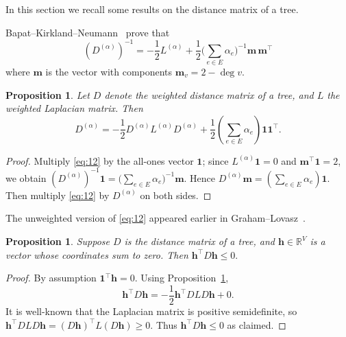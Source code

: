 \documentclass{amsart}
\newtheorem{prop}[thm]{Proposition}
\theoremstyle{definition}
\newcommand{\RR}{\mathbb{R}}
\newcommand{\bone}{\mathbf{1}}
\newcommand{\boldm}{\mathbf{m}}
\newcommand{\Da}{{D^{(\alpha)}}}
\newcommand{\La}{L^{(\alpha)}}
\newcommand{\tr}{\intercal}
\begin{document}
In this section we recall some results on the distance matrix of a tree.

Bapat--Kirkland--Neumann~\cite[Theorem 2.1]{bapat-kirkland-neumann} prove that
\begin{equation}
\label{eq:12}
	(\Da)^{-1} = - \frac12 \La + \frac12 \Big( \sum_{e \in E} \alpha_e\Big)^{-1} \boldm\, \boldm^\tr
\end{equation}
where $\boldm$ is the vector with components $\boldm_v = 2 - \deg v$.

\begin{prop}
\label{prop:dist-laplacian}
Let $D$ denote the weighted distance matrix of a tree, and $L$ the weighted Laplacian matrix. 
Then
\[
	\Da = - \frac{1}{2} \Da \La \Da + \frac{1}{2} \left( \sum_{e \in E} \alpha_e\right) \bone \bone^\tr .
\]
\end{prop}
\begin{proof}
Multiply \eqref{eq:12} by the all-ones vector $\bone$; since $\La \bone = 0$ and $\boldm^\tr \bone = 2$, we obtain $(\Da)^{-1} \bone = \Big( \sum_{e \in E} \alpha_e\Big)^{-1} \boldm$.
Hence $\Da \boldm = \left( \sum_{e \in E} \alpha_e \right) \bone$.
Then multiply \eqref{eq:12} by $\Da$ on both sides. 
\end{proof}
The unweighted version of \eqref{eq:12} appeared earlier in Graham--Lovasz~\cite[Lemma 1]{graham-lovasz}.

\begin{prop}
\label{prop:negdeg-hyperplane}
Suppose $D$ is the distance matrix of a tree, and $\mathbf{h} \in \RR^V$ is a vector whose coordinates sum to zero. 
Then
$
	\mathbf{h}^\tr D \mathbf{h} \leq 0.
$
\end{prop}
\begin{proof}
By assumption $\bone^\tr \mathbf{h} = 0$.
Using Proposition~\ref{prop:dist-laplacian},
\[
	\mathbf{h}^\tr D\mathbf{h} = - \frac12 \mathbf{h}^\tr DLD \mathbf{h} + 0.
\]
It is well-known that the Laplacian matrix is positive semidefinite, so $\mathbf{h}^\tr DLD \mathbf{h} = (D \mathbf{h})^\tr L (D \mathbf{h}) \geq 0$.
Thus $\mathbf{h}^\tr D \mathbf{h} \leq 0$
as claimed.
\end{proof}
\end{document}
